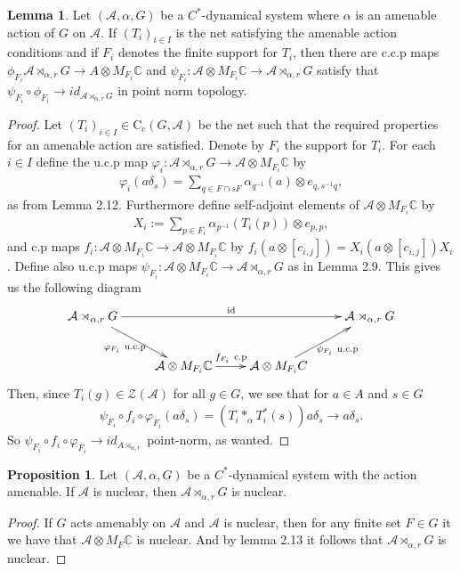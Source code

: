 \documentclass[10pt,oneside,openany,final]{memoir}
\theoremstyle{definition}
\newtheorem{lemma}[theorem]{Lemma}
\newtheorem{proposition}[theorem]{Proposition}
\theoremstyle{Break}
\newcommand{\C}{\mathbb{C}}
\newcommand{\A}{\mathcal{A}}
\newcommand{\cc}{\text{C}_{\text{c}}}
\begin{document}
\begin{lemma}
Let $(\A,\alpha,G)$ be a $C^*$-dynamical system where $\alpha$ is an amenable action of $G$ on $\A$. If $(T_{i})_{i \in I}$ is the net satisfying the amenable action conditions and if $F_{i}$ denotes the finite support for $T_{i}$, then there are c.c.p maps $\phi_{F_i} \A \rtimes_{\alpha,r} G \to A \otimes M_{F_i} \C$ and $\psi_{F_i} \colon \A \otimes M_{F_i} \C \to \A \rtimes_{\alpha,r} G$ satisfy that $\psi_{F_i} \circ \phi_{F_i} \to id_{\A \rtimes_{\alpha,r}G}$ in point norm topology.
\begin{proof}
Let $(T_{i})_{i \in I} \in \cc(G,\A)$ be the net such that the required properties for an amenable action are satisfied. Denote by $F_{i}$ the support for $T_{i}$. For each $i \in I$ define the u.c.p map $\varphi_{i} \colon \A \rtimes_{\alpha,r} G \to \A \otimes M_{F_{i}} \C$ by 
\begin{align*}
\varphi_{i}(a \delta_{s})=\sum_{q \in F \cap sF} \alpha_{q^{-1}}(a) \otimes e_{q,s^{-1}q},
\end{align*}
as from Lemma 2.12. Furthermore define self-adjoint elements of $\A \otimes M_{F_{i}}\C$ by
\begin{align*}
X_{i}:= \sum_{p \in F_{i}}\alpha_{p^{-1}}(T_{i}(p)) \otimes e_{p,p},
\end{align*}
and c.p maps  $f_{i} \colon \A \otimes M_{F_{i}}\C \to \A \otimes M_{F_{i}} \C$ by $f_{i}(a \otimes [c_{i,j}])=X_{i}(a \otimes [c_{i,j}])X_{i}$.
Define also u.c.p maps $\psi_{F_{i}} \colon \A \otimes M_{F_{i}}\C \to \A \rtimes_{\alpha,r} G$ as in Lemma 2.9. This gives us the following diagram
\begin{equation*}
\xymatrix{
\A \rtimes_{\alpha,r} G \ar[dr]_{\varphi_{F_i}\ \text{u.c.p}}  \ar[rrr]^{\text{id}} & & & \A \rtimes_{\alpha,r}G\\
& \A \otimes M_{F_{i}}\C \ar[r]^{f_{F_{i}} \ \text{c.p}} & \A \otimes M_{F_{i}}C \ar[ur]_{\psi_{F_{i}} \ \text{u.c.p}}& 
}
\end{equation*}
Then, since $T_{i}(g) \in \mathcal{Z}(\A)$ for all $g \in G$, we see that for $a \in A$ and $s \in G$ 
\begin{align*}
\psi_{F_{i}} \circ f_{i}\circ \varphi_{F_{i}}(a \delta_{s}) = (T_{i} \ast_{\alpha} T^*_{i}(s))a \delta_{s} \to a \delta_{s}.
\end{align*}
So $\psi_{F_{i}} \circ f_{i}\circ \varphi_{F_{i}} \to id_{A \rtimes_{\alpha,r}}$ point-norm, as wanted.
\end{proof}
\end{lemma}
\begin{proposition}
Let $(\A,\alpha,G)$ be a $C^*$-dynamical system with the action amenable. If $\A$ is nuclear, then $\A \rtimes_{\alpha,r}G$ is nuclear.
\begin{proof}
If $G$ acts amenably on $\A$ and $\A$ is nuclear, then for any finite set $F \in G$ it we have that $\A \otimes M_{F} \C$ is nuclear. And by lemma 2.13 it follows that $\A \rtimes_{\alpha,r} G$ is nuclear.
\end{proof}
\end{proposition}
\end{document}
